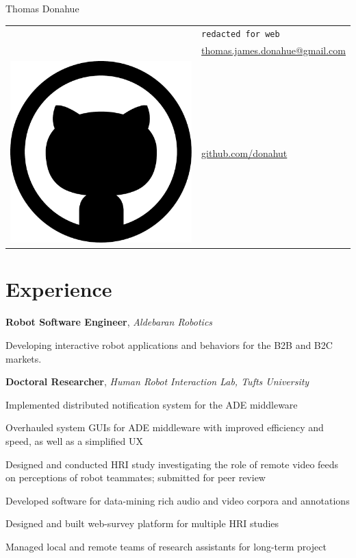 \documentclass[10pt, letter]{article}
\newcommand*\github{\includegraphics[height=2ex]{github.pdf}}
\newcommand{\years}[1]{\marginnote{\footnotesize #1}}
\newenvironment{itemize*}{
  \begin{itemize}
    \setlength{\itemsep}{0pt}
    \setlength{\parskip}{-1pt}
    \setlength{\parsep}{-1pt}
  }{
  \end{itemize}
}
\begin{document}
\begin{minipage}[t]{0.55\textwidth}
  {\huge Thomas Donahue}
\end{minipage}
\begin{minipage}[t]{0.4\textwidth}
  \begin{tabular}[h]{ll}
    \Phone{}    & \texttt{redacted for web}\\
    \Envelope{} & \href{mailto:thomas.james.donahue@gmail.com}{thomas.james.donahue@gmail.com}\\    
    \github{}   & \href{http://www.github.com/donahut}{github.com/donahut}
  \end{tabular}
\end{minipage}

\section*{Experience}
\years{Mar 2014--}
\textbf{Robot Software Engineer}, \textsl{Aldebaran Robotics}
\begin{itemize*}
\item Developing interactive robot applications and behaviors for the
  B2B and B2C markets.
\end{itemize*}

\years{2012--2014}
\textbf{Doctoral Researcher}, \textsl{Human Robot Interaction Lab,
  Tufts University}
\begin{itemize*}
\item Implemented distributed notification system for the ADE middleware
\item Overhauled system GUIs for ADE middleware with improved
  efficiency and\\ speed, as well as a simplified UX 
\item Designed and conducted HRI study investigating the role of
  remote video feeds\\ on perceptions of robot teammates; submitted
  for peer review 
\item Developed software for data-mining rich audio and video corpora
  and annotations
\item Designed and built web-survey platform for multiple HRI studies
\item Managed local and remote teams of research
  assistants for long-term project
\end{itemize*}
\end{document}
